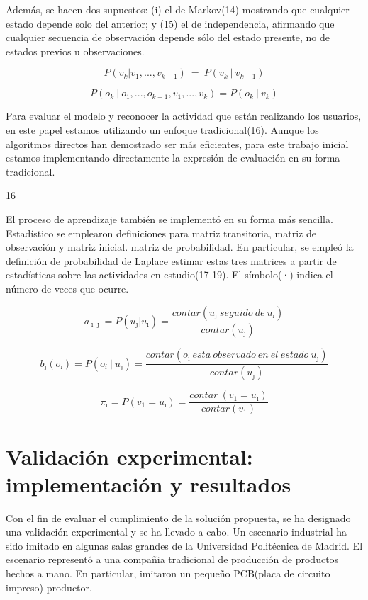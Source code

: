 \documentclass{article}
\begin{document}
Además, se hacen dos supuestos: (i) el de Markov(14) mostrando que cualquier estado depende solo del anterior; y (15) el de independencia, afirmando que cualquier secuencia de observación depende sólo del estado presente, no de estados previos u observaciones.


\begin{equation} P\left(v_k | v_1, ... , v_{k-1}\right) \ = \ P\left(v_k \ | \ v_{k-1}\right)  \end{equation}

\begin{equation}P\left(o_k \ | \ o_1, ..., o_{k-1}, v_1,...,v_k\right) = P\left(o_k \ | \  v_k\right)\end{equation}

Para evaluar el modelo y reconocer la actividad que están realizando los usuarios, en este papel estamos utilizando un enfoque tradicional(16). Aunque los algoritmos directos han demostrado ser más eficientes, para este trabajo inicial estamos implementando directamente la expresión de evaluación en su forma tradicional.

16

El proceso de aprendizaje también se implementó en su forma más sencilla. Estadístico se emplearon definiciones para matriz transitoria, matriz de observación y matriz inicial.
matriz de probabilidad. En particular, se empleó la definición de probabilidad de Laplace estimar estas tres matrices a partir de estadísticas sobre las actividades en estudio(17-19). El símbolo(·) indica el número de veces que ocurre.

\begin{equation} a_{\imath\jmath}  = P\left(u_\jmath  | u_\imath \right) = \frac{contar\left(u_\jmath \ seguido \ de \ u_\imath  \right) }{contar\left(u_\jmath \right) } \end{equation}

\begin{equation}b_\jmath\left(o_\imath \right) = P\left(o_i \ | \ u_\jmath \right)  = \frac{contar\left(o_\imath \ esta \ observado \  en \  el \  estado \ u_\jmath \right) }{contar\left(u_\jmath \right) }  \end{equation}

\begin{equation}\pi_\imath  = P\left(v_1 = u_\imath \right) = \frac{contar \ \left(v_1 = u_\imath \right)  }{contar\left(v_1\right) }  \end{equation}

\section {Validación experimental: implementación y resultados}
Con el fin de evaluar el cumplimiento de la solución propuesta, se ha designado una validación experimental y se ha llevado a cabo. Un escenario industrial ha sido imitado en algunas salas grandes de la Universidad Politécnica de Madrid. El escenario representó a una compañia tradicional de producción de productos hechos a mano. En particular, imitaron un pequeño PCB(placa de circuito impreso) productor.
\end{document}

